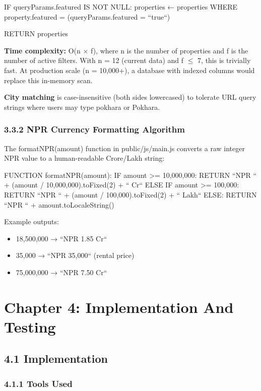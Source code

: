 \documentclass[12pt,a4paper]{report}
\begin{document}
  IF queryParams.featured IS NOT NULL:
    properties ← properties WHERE property.featured = (queryParams.featured = ``true``)

  RETURN properties

\textbf{Time complexity:} O(n $\times$ f), where n is the number of properties and f is the number of active filters. With n = 12 (current data) and f $\leq$ 7, this is trivially fast. At production scale (n = 10,000+), a database with indexed columns would replace this in-memory scan.

\textbf{City matching} is case-insensitive (both sides lowercased) to tolerate URL query strings where users may type pokhara or Pokhara.

\subsection{3.3.2 NPR Currency Formatting Algorithm}
The formatNPR(amount) function in public/js/main.js converts a raw integer NPR value to a human-readable Crore/Lakh string:

FUNCTION formatNPR(amount):
  IF amount >= 10,000,000:
    RETURN ``NPR `` + (amount / 10,000,000).toFixed(2) + `` Cr``
  ELSE IF amount >= 100,000:
    RETURN ``NPR `` + (amount / 100,000).toFixed(2) + `` Lakh``
  ELSE:
    RETURN ``NPR `` + amount.toLocaleString()

Example outputs:

\begin{itemize}
  \item \textbullet{} 18,500,000 → ``NPR 1.85 Cr``
  \item \textbullet{} 35,000 → ``NPR 35,000`` (rental price)
  \item \textbullet{} 75,000,000 → ``NPR 7.50 Cr``
\end{itemize}
\chapter{Chapter 4: Implementation And Testing}
\section{4.1 Implementation}
\subsection{4.1.1 Tools Used}
\end{document}
